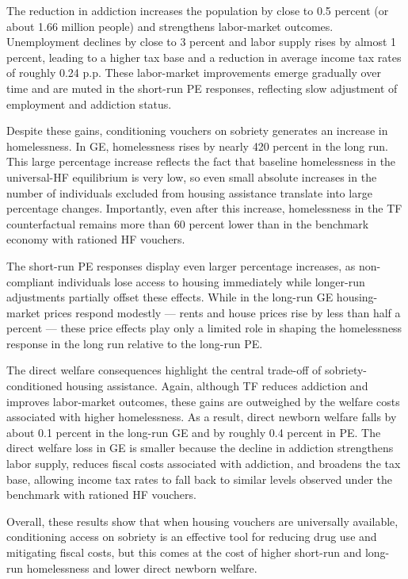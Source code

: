 \documentclass[parskip=full]{article}
\theoremstyle{plain}
\theoremstyle{definition}
\theoremstyle{remark}
\begin{document}
The reduction in addiction increases the population by close to 0.5 percent (or about 1.66 million people) and strengthens labor-market outcomes. Unemployment declines by close to 3 percent and labor supply rises by almost 1 percent, leading to a higher tax base and a reduction in average income tax rates of roughly 0.24 p.p. These labor-market improvements emerge gradually over time and are muted in the short-run PE responses, reflecting slow adjustment of employment and addiction status.

Despite these gains, conditioning vouchers on sobriety generates an increase in homelessness. In GE, homelessness rises by nearly 420 percent in the long run. This large percentage increase reflects the fact that baseline homelessness in the universal-HF equilibrium is very low, so even small absolute increases in the number of individuals excluded from housing assistance translate into large percentage changes. Importantly, even after this increase, homelessness in the TF counterfactual remains more than 60 percent lower than in the benchmark economy with rationed HF vouchers. 

The short-run PE responses display even larger percentage increases, as non-compliant individuals lose access to housing immediately while longer-run adjustments partially offset these effects. While in the long-run GE housing-market prices respond modestly — rents and house prices rise by less than half a percent — these price effects play only a limited role in shaping the homelessness response in the long run relative to the long-run PE.

The direct welfare consequences highlight the central trade-off of sobriety-conditioned housing assistance. Again, although TF reduces addiction and improves labor-market outcomes, these gains are outweighed by the welfare costs associated with higher homelessness. As a result, direct newborn welfare falls by about 0.1 percent in the long-run GE and by roughly 0.4 percent in PE. The direct welfare loss in GE is smaller because the decline in addiction strengthens labor supply, reduces fiscal costs associated with addiction, and broadens the tax base, allowing income tax rates to fall back to similar levels 
observed under the benchmark with rationed HF vouchers.

Overall, these results show that when housing vouchers are universally available, conditioning access on sobriety is an effective tool for reducing drug use and mitigating fiscal costs, but this comes at the cost of higher short-run and long-run homelessness and lower direct newborn welfare.
\end{document}
